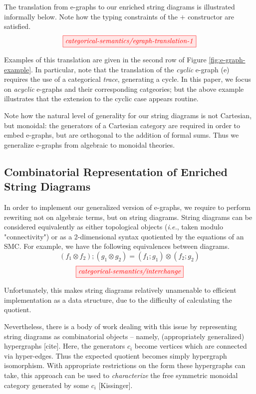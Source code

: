 The translation from e-graphs to our enriched string diagrams is illustrated informally below. 
Note how the typing constraints of the $+$ constructor are satisfied.
\[
    \tikzfig{categorical-semantics/egraph-translation-1}
\]

Examples of this translation are given in the second row of Figure \ref{fig:e-graph-example}. In particular, note that the translation of the \textit{cyclic} e-graph (e)
requires the use of a categorical \textit{trace}, generating a cycle. In this paper, we focus on \textit{acyclic} e-graphs and their corresponding catgeories; but the above example illustrates that the extension to the cyclic case appears routine.

Note how the natural level of generality for our string diagrams is not Cartesian, but monoidal: the generators of a Cartesian category are required in order to embed e-graphs, but are orthogonal to the addition of formal sums. Thus we generalize e-graphs from algebraic to monoidal theories. 

\subsection*{Combinatorial Representation of Enriched String Diagrams}

In order to implement our generalized version of e-graphs, we require to perform rewriting not on algebraic terms, but on string diagrams. String diagrams can be considered equivalently as either topological objects (\textit{i.e.}, taken modulo "connectivity") or as a 2-dimensional syntax quotiented by the equations of an SMC. For example, we have the following equivalences between diagrams. 
\[(f_1 \otimes f_2) ; (g_1 \otimes g_2) = (f_1 ; g_1) \otimes (f_2 ; g_2)\] 
\[
	\tikzfig{categorical-semantics/interchange}
\]

Unfortunately, this makes string diagrams relatively unamenable to efficient implementation as a data structure, due to the difficulty of calculating the quotient. 

Nevertheless, there is a body of work dealing with this issue by representing string diagrams as combinatorial objects -- namely, (appropriately generalized) hypergraphs [cite]. Here, the generators $c_i$ become vertices which are connected via hyper-edges. Thus the expected quotient becomes simply hypergraph isomorphism. With appropriate restrictions on the form these hypergraphs can take, this approach can be used to \textit{characterize} the free symmetric monoidal category generated by some $c_i$ [Kissinger]. 

